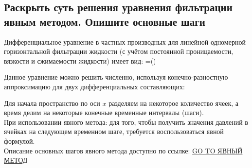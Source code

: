 

\subsection{Раскрыть суть решения уравнения фильтрации явным методом. Опишите основные шаги}

Дифференциальное уравнение в частных производных для линейной одномерной горизонтальной фильтрации жидкости (с учётом постоянной проницаемости, вязкости и сжимаемости жидкости) имеет вид:
\beq
{}=\left(\right)
\eeq

Данное уравнение можно решить численно, используя конечно-разностную аппроксимацию для двух дифференциальных составляющих:
\beq
{}
\eeq

Для начала пространство по оси $x$ разделяем на некоторое количество ячеек, а время делим на некоторые конечные временные интервалы (шаги).
\\

При использовании явного метода: для того, чтобы получить значения давлений в ячейках на следующем временном шаге, требуется воспользоваться явной формулой.
\\


Описание основных шагов явного метода доступно по ссылке: \href{https://docs.yandex.ru/docs/view?url=ya-disk-public\%3A\%2F\%2FWicxck3PRHBvGgXBKaNry\%2FRtiluR1m6cR6Bi14xdyyNQDBM0D9VXsHr3EpLffWemDqZvSgIch5AN9ddz7ydViQ\%3D\%3D\%3A\%2F\%D0\%92\%D1\%82\%D0\%BE\%D1\%80\%D0\%BE\%D0\%B9\%20\%D0\%BA\%D1\%83\%D1\%80\%D1\%81\%20\%D0\%BC\%D0\%B0\%D0\%B3\%D0\%B8\%D1\%81\%D1\%82\%D1\%80\%D0\%B0\%D1\%82\%D1\%83\%D1\%80\%D1\%8B\%2F\%D0\%93\%D0\%B8\%D0\%B4\%D1\%80\%D0\%BE\%D0\%B4\%D0\%B8\%D0\%BD\%D0\%B0\%D0\%BC\%D0\%B8\%D1\%87\%D0\%B5\%D1\%81\%D0\%BA\%D0\%BE\%D0\%B5\%20\%D0\%BC\%D0\%BE\%D0\%B4\%D0\%B5\%D0\%BB\%D0\%B8\%D1\%80\%D0\%BE\%D0\%B2\%D0\%B0\%D0\%BD\%D0\%B8\%D0\%B5\%2FExplicit\%20Numerical\%20Solution\%20of\%20One-Dimensional\%20Filtration\%20in\%20a\%20Reservoir.pdf&name=Explicit\%20Numerical\%20Solution\%20of\%20One-Dimensional\%20Filtration\%20in\%20a\%20Reservoir.pdf&nosw=1}{GO TO ЯВНЫЙ МЕТОД}

